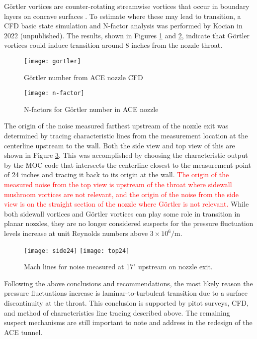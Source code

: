 Görtler vortices are counter-rotating streamwise vortices that occur in boundary layers on concave surfaces \cite{saric}. To estimate where these may lead to transition, a CFD basic state simulation and N-factor analysis was performed by Kocian in 2022 (unpublished). The results, shown in Figures \ref{fig:gortler} and \ref{fig:n-factor}, indicate that Görtler vortices could induce transition around 8 inches from the nozzle throat. 

\begin{figure}[ht!]
    \centering
    \texttt{[image: gortler]}
    \caption{Görtler number from ACE nozzle CFD}
    \label{fig:gortler}
\end{figure}

\begin{figure}[ht!]
    \centering
    \texttt{[image: n-factor]}
    \caption{N-factors for Görtler number in ACE nozzle}
    \label{fig:n-factor}
\end{figure}

The origin of the noise measured farthest upstream of the nozzle exit was determined by tracing characteristic lines from the measurement location at the centerline upstream to the wall. Both the side view and top view of this are shown in Figure \ref{fig:machlines}. This was accomplished by choosing the characteristic output by the MOC code that intersects the centerline closest to the measurement point of 24 inches and tracing it back to its origin at the wall. \textcolor{red}{The origin of the measured noise from the top view is upstream of the throat where sidewall mushroom vortices are not relevant, and the origin of the noise from the side view is on the straight section of the nozzle where Görtler is not relevant.} While both sidewall vortices and Görtler vortices can play some role in transition in planar nozzles, they are no longer considered suspects for the pressure fluctuation levels increase at unit Reynolds numbers above $3 \times 10^6/\mathrm{m}$.

\begin{figure}[ht!]
    \centering
    \texttt{[image: side24]}
    \texttt{[image: top24]}
    \caption{Mach lines for noise measured at 17" upstream on nozzle exit.}
    \label{fig:machlines}
\end{figure}

Following the above conclusions and recommendations, the most likely reason the pressure fluctuations increase is laminar-to-turbulent transition due to a surface discontinuity at the throat. This conclusion is supported by pitot surveys, CFD, and method of characteristics line tracing described above. The remaining suspect mechanisms are still important to note and address in the redesign of the ACE tunnel. 

